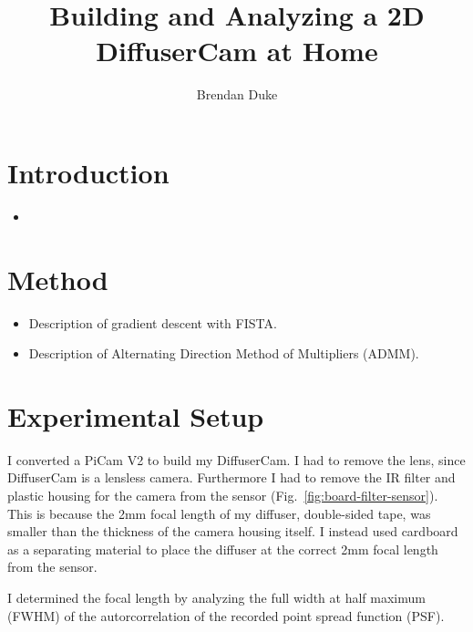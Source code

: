\documentclass[final]{cvpr}
\begin{document}
\title{Building and Analyzing a 2D DiffuserCam at Home}

\author{Brendan Duke}

\maketitle

\begin{abstract}
\end{abstract}

\section{Introduction}

\begin{itemize}
	\item
\end{itemize}


\section{Method}

\begin{itemize}
	\item Description of gradient descent with FISTA\@.

	\item Description of Alternating Direction Method of Multipliers
	      (ADMM).
\end{itemize}


\section{Experimental Setup}

I converted a PiCam V2 to build my DiffuserCam.
I had to remove the lens, since DiffuserCam is a lensless camera.
Furthermore I had to remove the IR filter and plastic housing for the camera
from the sensor (Fig.~\ref{fig:board-filter-sensor}).
This is because the 2mm focal length of my diffuser,
double-sided tape, was smaller than the thickness of the camera housing itself.
I instead used cardboard as a separating material to place the diffuser at the
correct 2mm focal length from the sensor.

I determined the focal length by analyzing the full width at half maximum
(FWHM) of the autorcorrelation of the recorded point spread function (PSF).
\end{document}
